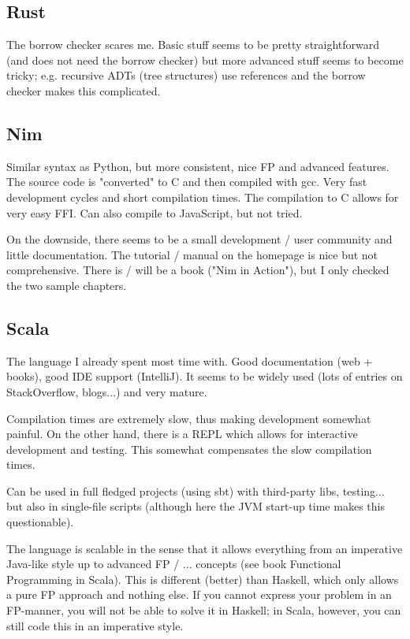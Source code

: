 \subsection{Rust}

The borrow checker scares me. Basic stuff seems to be pretty straightforward (and does not need the borrow checker) but more advanced stuff seems to become tricky; e.g. recursive ADTs (tree structures) use references and the borrow checker makes this complicated.

\subsection{Nim}

Similar syntax as Python, but more consistent, nice FP and advanced features. The source code is "converted" to C and then compiled with gcc. Very fast development cycles and short compilation times. The compilation to C allows for very easy FFI. Can also compile to JavaScript, but not tried.

On the downside, there seems to be a small development / user community and little documentation. The tutorial / manual on the homepage is nice but not comprehensive. There is / will be a book ("Nim in Action"), but I only checked the two sample chapters.

\subsection{Scala}

The language I already spent most time with. Good documentation (web + books), good IDE support (IntelliJ). It seems to be widely used (lots of entries on StackOverflow, blogs...) and very mature.

Compilation times are extremely slow, thus making development somewhat painful. On the other hand, there is a REPL which allows for interactive development and testing. This somewhat compensates the slow compilation times.

Can be used in full fledged projects (using sbt) with third-party libs, testing... but also in single-file scripts (although here the JVM start-up time makes this questionable).

The language is scalable in the sense that it allows everything from an imperative Java-like style up to advanced FP / ... concepts (see book Functional Programming in Scala). This is different (better) than Haskell, which only allows a pure FP approach and nothing else. If you cannot express your problem in an FP-manner, you will not be able to solve it in Haskell; in Scala, however, you can still code this in an imperative style.

